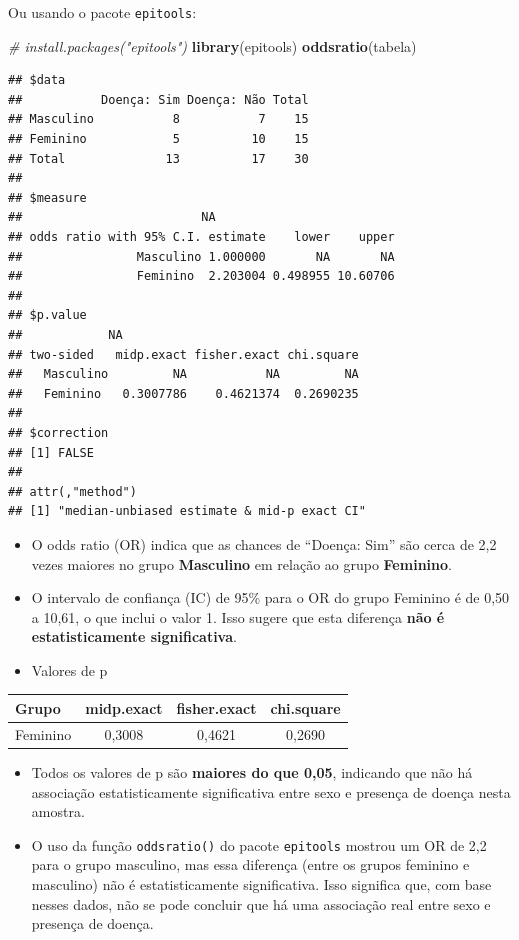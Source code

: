 \documentclass[
]{book}
\newenvironment{Shaded}{\begin{snugshade}}{\end{snugshade}}
\newcommand{\CommentTok}[1]{\textcolor[rgb]{0.56,0.35,0.01}{\textit{#1}}}
\newcommand{\FunctionTok}[1]{\textcolor[rgb]{0.13,0.29,0.53}{\textbf{#1}}}
\newcommand{\NormalTok}[1]{#1}
\newcounter{none} %
\begin{document}
Ou usando o pacote \texttt{epitools}:

\begin{Shaded}
\begin{Highlighting}[]
\CommentTok{\# install.packages("epitools")}
\FunctionTok{library}\NormalTok{(epitools)}
\FunctionTok{oddsratio}\NormalTok{(tabela)}
\end{Highlighting}
\end{Shaded}

\begin{verbatim}
## $data
##           Doença: Sim Doença: Não Total
## Masculino           8           7    15
## Feminino            5          10    15
## Total              13          17    30
## 
## $measure
##                         NA
## odds ratio with 95% C.I. estimate    lower    upper
##                Masculino 1.000000       NA       NA
##                Feminino  2.203004 0.498955 10.60706
## 
## $p.value
##            NA
## two-sided   midp.exact fisher.exact chi.square
##   Masculino         NA           NA         NA
##   Feminino   0.3007786    0.4621374  0.2690235
## 
## $correction
## [1] FALSE
## 
## attr(,"method")
## [1] "median-unbiased estimate & mid-p exact CI"
\end{verbatim}

\begin{itemize}
\item
  O odds ratio (OR) indica que as chances de ``Doença: Sim'' são cerca de 2,2 vezes maiores no grupo \textbf{Masculino} em relação ao grupo \textbf{Feminino}.
\item
  O intervalo de confiança (IC) de 95\% para o OR do grupo Feminino é de 0,50 a 10,61, o que inclui o valor 1. Isso sugere que esta diferença \textbf{não é estatisticamente significativa}.
\item
  Valores de p
\end{itemize}

{\def\LTcaptype{none} %
\begin{longtable}[]{@{}lccc@{}}
\toprule\noalign{}
Grupo & midp.exact & fisher.exact & chi.square \\
\midrule\noalign{}
\endhead
\bottomrule\noalign{}
\endlastfoot
Feminino & 0,3008 & 0,4621 & 0,2690 \\
\end{longtable}
}

\begin{itemize}
\item
  Todos os valores de p são \textbf{maiores do que 0,05}, indicando que não há associação estatisticamente significativa entre sexo e presença de doença nesta amostra.
\item
  O uso da função \texttt{oddsratio()} do pacote \texttt{epitools} mostrou um OR de 2,2 para o grupo masculino, mas essa diferença (entre os grupos feminino e masculino) não é estatisticamente significativa. Isso significa que, com base nesses dados, não se pode concluir que há uma associação real entre sexo e presença de doença.
\end{itemize}
\end{document}

